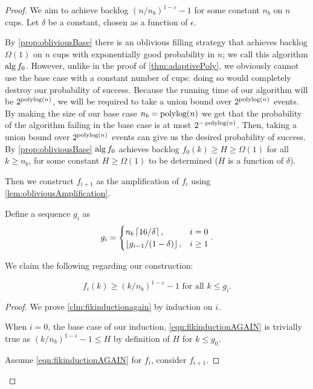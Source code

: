 \begin{proof}
  We aim to achieve backlog $(n/n_b)^{1-\varepsilon}-1$ for some constant $n_b$ on $n$ cups.
  Let $\delta$ be a constant, chosen as a function of $\epsilon$.

  By \cref{prop:obliviousBase} there is an oblivious filling
  strategy that achieves backlog $\Omega(1)$ on $n$ cups with
  exponentially good probability in $n$; we call this algorithm
  $\operatorname{\text{\textup{alg}}}{f_0}$. However, unlike in the proof of
  \cref{thm:adaptivePoly}, we obviously cannot use the base case
  with a constant number of cups: doing so would completely
  destroy our probability of success. Because the running time of
  our algorithm will be $2^{\operatorname{\text{polylog}}(n)}$, we will be required to
  take a union bound over $2^{\operatorname{\text{polylog}}(n)}$ events. By making the
  size of our base case $n_b = \operatorname{\text{polylog}}(n)$ we get that the
  probability of the algorithm failing in the base case is at
  most $2^{-\operatorname{\text{polylog}}(n)}$. Then, taking a union bound over
  $2^{\operatorname{\text{polylog}}(n)}$ events can give us the desired probability of
  success. By \cref{prop:obliviousBase} $\operatorname{\text{\textup{alg}}}{f_0}$ achieves
  backlog $f_0(k) \ge H \ge \Omega(1)$ for all $k \ge n_b$, for
  some constant $H \ge \Omega(1)$ to be determined ($H$ is a
  function of $\delta$).

  Then we construct $f_{i+1}$ as the amplification of $f_i$ using
  \cref{lem:obliviousAmplification}.

  Define a sequence $g_i$ as 
  $$g_i =
  \begin{cases}
    n_b\left\lceil 16/\delta \right\rceil, & i=0\\
    \left\lfloor  g_{i-1}/(1-\delta)  \right\rfloor, & i\ge 1 
  \end{cases}.$$

  We claim the following regarding our construction:
  \begin{clm}
    \label{clm:fikinductionagain}
    \begin{equation}
      f_i(k) \ge (k/n_b)^{1-\varepsilon} - 1 \text{ for all } k \le g_i. \label{eqn:fikinductionAGAIN}
    \end{equation}
  \end{clm}
  \begin{proof}
  We prove \cref{clm:fikinductionagain} by induction on $i$. 

  When $i=0$, the base case of our induction,
  \eqref{eqn:fikinductionAGAIN} is trivially true as
  $(k/n_b)^{1-\epsilon} - 1 \le H$ by definition of $H$ for $k\le g_0$.

  Assume \eqref{eqn:fikinductionAGAIN} for $f_i$, consider $f_{i+1}$. 


\end{proof}
\end{proof}
